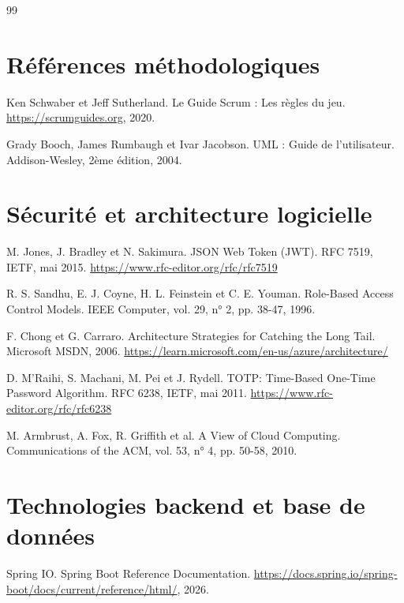 \documentclass[12pt,a4paper]{report}
\begin{document}
\begin{thebibliography}{99}

\section*{Références méthodologiques}

Ken Schwaber et Jeff Sutherland.
Le Guide Scrum : Les règles du jeu.
\url{https://scrumguides.org}, 2020.

Grady Booch, James Rumbaugh et Ivar Jacobson.
UML : Guide de l'utilisateur.
Addison-Wesley, 2ème édition, 2004.

\section*{Sécurité et architecture logicielle}

M. Jones, J. Bradley et N. Sakimura.
JSON Web Token (JWT).
RFC 7519, IETF, mai 2015.
\url{https://www.rfc-editor.org/rfc/rfc7519}

R. S. Sandhu, E. J. Coyne, H. L. Feinstein et C. E. Youman.
Role-Based Access Control Models.
IEEE Computer, vol. 29, n° 2, pp. 38-47, 1996.

F. Chong et G. Carraro.
Architecture Strategies for Catching the Long Tail.
Microsoft MSDN, 2006.
\url{https://learn.microsoft.com/en-us/azure/architecture/}

D. M'Raihi, S. Machani, M. Pei et J. Rydell.
TOTP: Time-Based One-Time Password Algorithm.
RFC 6238, IETF, mai 2011.
\url{https://www.rfc-editor.org/rfc/rfc6238}

M. Armbrust, A. Fox, R. Griffith et al.
A View of Cloud Computing.
Communications of the ACM, vol. 53, n° 4, pp. 50-58, 2010.

\section*{Technologies backend et base de données}

Spring IO.
Spring Boot Reference Documentation.
\url{https://docs.spring.io/spring-boot/docs/current/reference/html/}, 2026.


\end{thebibliography}
\end{document}
